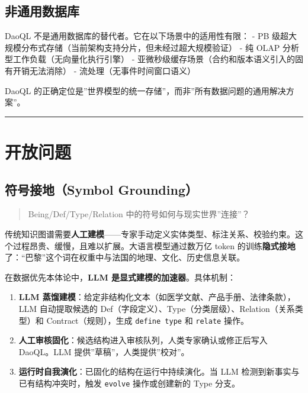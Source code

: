 \documentclass[11pt,a4paper]{ctexart}
\begin{document}
\subsection{非通用数据库}\label{ux975eux901aux7528ux6570ux636eux5e93}

DaoQL 不是通用数据库的替代者。它在以下场景中的适用性有限： - PB
级超大规模分布式存储（当前架构支持分片，但未经过超大规模验证） - 纯 OLAP
分析型工作负载（无向量化执行引擎） -
亚微秒级缓存场景（合约和版本语义引入的固有开销无法消除） -
流处理（无事件时间窗口语义）

DaoQL
的正确定位是''世界模型的统一存储''，而非''所有数据问题的通用解决方案''。

\begin{center}\rule{0.5\linewidth}{0.5pt}\end{center}

\section{开放问题}\label{ux5f00ux653eux95eeux9898}

\subsection{符号接地（Symbol
Grounding）}\label{ux7b26ux53f7ux63a5ux5730symbol-grounding}

\begin{quote}
Being/Def/Type/Relation 中的符号如何与现实世界''连接''？
\end{quote}

传统知识图谱需要\textbf{人工建模}------专家手动定义实体类型、标注关系、校验约束。这个过程昂贵、缓慢，且难以扩展。大语言模型通过数万亿
token
的训练\textbf{隐式接地}了：``巴黎''这个词在权重中与法国的地理、文化、历史信息关联。

在数据优先本体论中，\textbf{LLM 是显式建模的加速器}。具体机制：

\begin{enumerate}
\def\labelenumi{\arabic{enumi}.}
\item
  \textbf{LLM
  蒸馏建模}：给定非结构化文本（如医学文献、产品手册、法律条款），LLM
  自动提取候选的
  Def（字段定义）、Type（分类层级）、Relation（关系类型）和
  Contract（规则），生成 \texttt{define\ type} 和 \texttt{relate} 操作。
\item
  \textbf{人工审核固化}：候选结构进入审核队列，人类专家确认或修正后写入
  DaoQL。LLM 提供''草稿''，人类提供''校对''。
\item
  \textbf{运行时自我演化}：已固化的结构在运行中持续演化。当 LLM
  检测到新事实与已有结构冲突时，触发 \texttt{evolve} 操作或创建新的 Type
  分支。
\end{enumerate}
\end{document}
